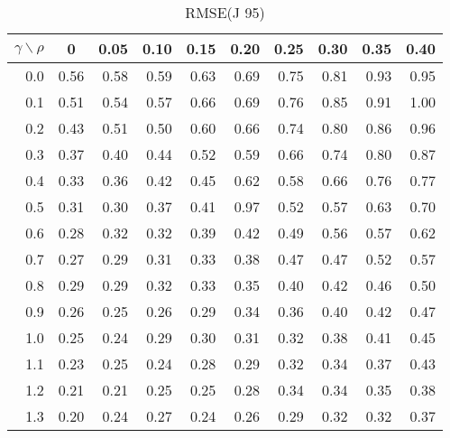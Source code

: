 \documentclass[12pt]{article}
\begin{document}
\begin{table}[!tbp]
\caption{RMSE(J 95)}
 \begin{center}
 \begin{tabular}{r|rrrrrrrrr}\hline\hline
\multicolumn{1}{c|}{$\gamma\backslash\rho$}&\multicolumn{1}{c}{0}&\multicolumn{1}{c}{0.05}&\multicolumn{1}{c}{0.10}&\multicolumn{1}{c}{0.15}&\multicolumn{1}{c}{0.20}&\multicolumn{1}{c}{0.25}&\multicolumn{1}{c}{0.30}&\multicolumn{1}{c}{0.35}&\multicolumn{1}{c}{0.40}\tabularnewline
\hline


0.0&0.56&0.58&0.59&0.63&0.69&0.75&0.81&0.93&0.95\tabularnewline
0.1&0.51&0.54&0.57&0.66&0.69&0.76&0.85&0.91&1.00\tabularnewline
0.2&0.43&0.51&0.50&0.60&0.66&0.74&0.80&0.86&0.96\tabularnewline
0.3&0.37&0.40&0.44&0.52&0.59&0.66&0.74&0.80&0.87\tabularnewline
0.4&0.33&0.36&0.42&0.45&0.62&0.58&0.66&0.76&0.77\tabularnewline
0.5&0.31&0.30&0.37&0.41&0.97&0.52&0.57&0.63&0.70\tabularnewline
0.6&0.28&0.32&0.32&0.39&0.42&0.49&0.56&0.57&0.62\tabularnewline
0.7&0.27&0.29&0.31&0.33&0.38&0.47&0.47&0.52&0.57\tabularnewline
0.8&0.29&0.29&0.32&0.33&0.35&0.40&0.42&0.46&0.50\tabularnewline
0.9&0.26&0.25&0.26&0.29&0.34&0.36&0.40&0.42&0.47\tabularnewline
1.0&0.25&0.24&0.29&0.30&0.31&0.32&0.38&0.41&0.45\tabularnewline
1.1&0.23&0.25&0.24&0.28&0.29&0.32&0.34&0.37&0.43\tabularnewline
1.2&0.21&0.21&0.25&0.25&0.28&0.34&0.34&0.35&0.38\tabularnewline
1.3&0.20&0.24&0.27&0.24&0.26&0.29&0.32&0.32&0.37\tabularnewline
\hline
\end{tabular}

\end{center}

\end{table}

%
\end{document}
